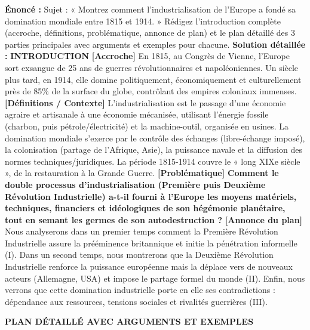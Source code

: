 \documentclass[11pt]{article}
\newcommand{\cle}[1]{{\popxbold\color{popdark}#1}}
\begin{document}
\begin{exoresolu}
\textbf{Énoncé :} Sujet : « Montrez comment l'industrialisation de l'Europe a fondé sa domination mondiale entre 1815 et 1914. » Rédigez l'introduction complète (accroche, définitions, problématique, annonce de plan) et le plan détaillé des 3 parties principales avec arguments et exemples pour chacune.
\tcblower
\textbf{Solution détaillée :}
\textbf{INTRODUCTION}
\textbf{[Accroche]} En 1815, au Congrès de Vienne, l'Europe sort exsangue de 25 ans de guerres révolutionnaires et napoléoniennes. Un siècle plus tard, en 1914, elle domine politiquement, économiquement et culturellement près de 85\% de la surface du globe, contrôlant des empires coloniaux immenses.
\textbf{[Définitions / Contexte]} L'\cle{industrialisation} est le passage d'une économie agraire et artisanale à une économie mécanisée, utilisant l'énergie fossile (charbon, puis pétrole/électricité) et la machine-outil, organisée en usines. La \cle{domination mondiale} s'exerce par le contrôle des échanges (libre-échange imposé), la colonisation (partage de l'Afrique, Asie), la puissance navale et la diffusion des normes techniques/juridiques. La période 1815-1914 couvre le « long XIXe siècle », de la restauration à la Grande Guerre.
\textbf{[Problématique]} \textbf{Comment le double processus d'industrialisation (Première puis Deuxième Révolution Industrielle) a-t-il fourni à l'Europe les moyens matériels, techniques, financiers et idéologiques de son hégémonie planétaire, tout en semant les germes de son autodestruction ?}
\textbf{[Annonce du plan]} Nous analyserons dans un premier temps comment la Première Révolution Industrielle assure la prééminence britannique et initie la pénétration informelle (I). Dans un second temps, nous montrerons que la Deuxième Révolution Industrielle renforce la puissance européenne mais la déplace vers de nouveaux acteurs (Allemagne, USA) et impose le partage formel du monde (II). Enfin, nous verrons que cette domination industrielle porte en elle ses contradictions : dépendance aux ressources, tensions sociales et rivalités guerrières (III).

\textbf{PLAN DÉTAILLÉ AVEC ARGUMENTS ET EXEMPLES}


\end{exoresolu}
\end{document}
